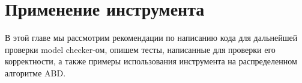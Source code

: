 \section{Применение инструмента}
\label{sec:user}

В этой главе мы рассмотрим рекомендации по написанию кода для дальнейшей проверки model checker-ом, опишем тесты, написанные для проверки его корректности, а также примеры использования инструмента на распределенном алгоритме ABD.





